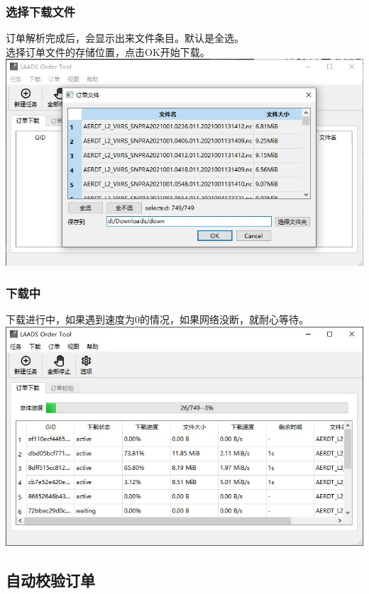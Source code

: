 \begin{frame}
    \frametitle{选择下载文件}
    订单解析完成后，会显示出来文件条目。默认是全选。\\
    选择订单文件的存储位置，点击OK开始下载。
    \includegraphics[width=\linewidth]{images/2B.10订单解析结果}
\end{frame}

\begin{frame}
    \frametitle{下载中}
    下载进行中，如果遇到速度为0的情况，如果网络没断，就耐心等待。
    \includegraphics[width=\linewidth]{images/2B.11下载中.jpg}
\end{frame}

\subsection{自动校验订单}

